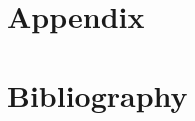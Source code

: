 \documentclass[twoside,12pt,onecolumn]{Latex/Classes/PhDthesisPSnPDF}
\begin{document}
\backmatter



\appendix
\part{Appendix}
\label{sec:appendix}






\printnomenclature %




\part{Bibliography}
\label{sec:bibliography}







%
%
%
\end{document}
